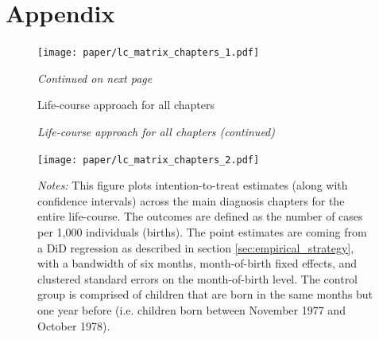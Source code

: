\documentclass[11pt, a4paper]{article} %
\begin{document}
\newpage
\section{Appendix}



\begin{figure}[H]\centering
	\caption{Life-course approach for all chapters}\label{fig: appendix_lc_matrix_chapters}
	\texttt{[image: paper/lc\_matrix\_chapters\_1.pdf]}
		\scriptsize
		\begin{minipage}{\linewidth}
			\emph{Continued on next page}
		\end{minipage}
\end{figure}

\begin{figure}[H]\centering
		\begin{minipage}{\linewidth}\scriptsize
		\begin{center} \emph{Life-course approach for all chapters (continued)}\end{center}
	\end{minipage}
	\texttt{[image: paper/lc\_matrix\_chapters\_2.pdf]}
		\begin{minipage}{\linewidth}
		\scriptsize \emph{Notes:} This figure plots intention-to-treat estimates (along with confidence intervals) across the main diagnosis chapters for the entire life-course. The outcomes are defined as the number of cases per 1,000 individuals (births). The point estimates are coming from a DiD regression as described in section \ref{sec:empirical_strategy}, with a bandwidth of six months, month-of-birth fixed effects, and clustered standard errors on the month-of-birth level. The control group is comprised of children that are born in the same months but one year before (i.e. children born between November 1977 and October 1978).\
	\end{minipage}
\end{figure}









\newpage
\end{document}
